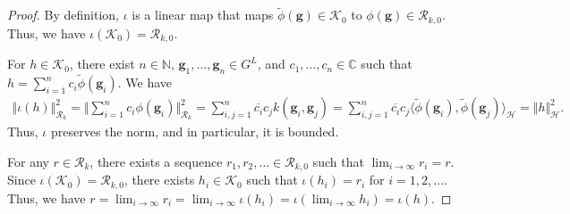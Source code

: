 \documentclass[10pt,a4paper]{amsart}
\def\bg{\mathbf{g}}
\def\hil{\mcl{H}}
\def\mcl#1{\mathcal{#1}}
\def\sbracket#1{\langle #1\rangle}
\begin{document}
\begin{proof}
By definition, $\iota$ is a linear map that maps $\tilde{\phi}(\bg)\in\mcl{K}_0$ to $\phi(\bg)\in\mcl{R}_{k,0}$.
Thus, we have $\iota(\mcl{K}_0)=\mcl{R}_{k,0}$.

For $h\in\mcl{K}_0$, there exist $n\in\mathbb{N}$, $\bg_1,\ldots,\bg_n\in G^L$, and $c_1,\ldots,c_n\in\mathbb{C}$ such that $h=\sum_{i=1}^nc_i\tilde{\phi}(\bg_i)$.
We have
\begin{align*}
\Vert\iota(h)\Vert^2_{\mcl{R}_k} = \bigg\Vert\sum_{i=1}^n c_i \phi(\bg_i)\bigg\Vert^2_{\mathcal{R}_k} = \sum_{i,j=1}^n\overline{c_i}c_jk(\bg_i,\bg_j)
=\sum_{i,j=1}^n\overline{c_i}c_j\sbracket{\tilde{\phi}(\bg_i),\tilde{\phi}(\bg_j)}_{\hil}
=\Vert h\Vert^2_{\hil}.
\end{align*}
Thus, $\iota$ preserves the norm, and in particular, it is bounded.

For any $r\in \mcl{R}_k$, there exists a sequence $r_1,r_2,\ldots \in \mcl{R}_{k,0}$ such that $\lim_{i\to\infty}r_i=r$.
Since $\iota(\mcl{K}_0)=\mcl{R}_{k,0}$, there exists $h_i\in\mcl{K}_0$ such that $\iota(h_i)=r_i$ for $i=1,2,\ldots$.
Thus, we have $r=\lim_{i\to\infty}r_i=\lim_{i\to\infty}\iota(h_i)=\iota(\lim_{i\to\infty}h_i)=\iota(h)$.
\end{proof}
\end{document}
